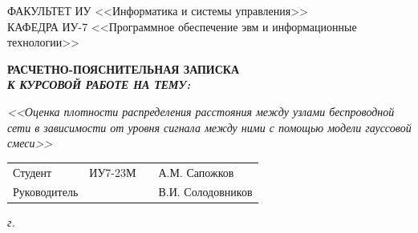 \begin{titlepage}
	{
		\small \raggedright
		ФАКУЛЬТЕТ ИУ <<Информатика и системы управления>> \\
		\vspace{3.3mm}
		КАФЕДРА ИУ-7 <<Программное обеспечение эвм и информационные технологии>> \\
	}
	
	\vspace{20.8mm}
	
	{
		\LARGE \bfseries
		РАСЧЕТНО-ПОЯСНИТЕЛЬНАЯ ЗАПИСКА \\
	}
	\vspace{5mm}
	{
		\Large \bfseries \itshape
		К КУРСОВОЙ РАБОТЕ НА ТЕМУ: \\
	}
	
	{
		\Large \itshape
		<<Оценка плотности распределения расстояния между узлами беспроводной сети в зависимости от уровня сигнала между ними с помощью модели гауссовой смеси>>
	}
	
	\vfill
	
	\begin{tabular}{p{}PPT}
		Студент &  ИУ7-23М & \uline{} & А.М. Сапожков \\
		Руководитель & ~ &  \uline{} & В.И. Солодовников \\
	\end{tabular}
	
	\vspace{14mm}
	
	\textit{{\the\year} г.}
	
\end{titlepage}
